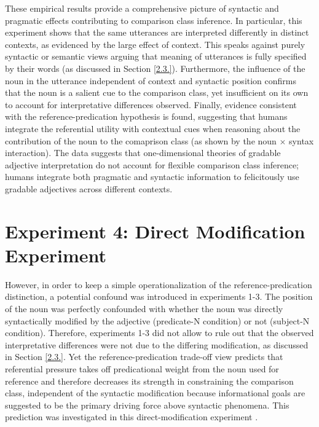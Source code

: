 These empirical results provide a comprehensive picture of syntactic and pragmatic effects contributing to comparison class inference. In particular, this experiment shows that the same utterances are interpreted differently in distinct contexts, as evidenced by the large effect of context. This speaks against purely syntactic or semantic views arguing that meaning of utterances is fully specified by their words (as discussed in Section \ref{2.3.}). Furthermore, the influence of the noun in the utterance independent of context and syntactic position confirms that the noun is a salient cue to the comparison class, yet insufficient on its own to account for interpretative differences observed. Finally, evidence consistent with the reference-predication hypothesis is found, suggesting that humans integrate the referential utility with contextual cues when reasoning about the contribution of the noun to the comaprison class (as shown by the noun $\times$ syntax interaction). The data suggests that one-dimensional theories of gradable adjective interpretation do not account for flexible comparison class inference; humans integrate both pragmatic and syntactic information to felicitously use gradable adjectives across different contexts. 

\section{Experiment 4: Direct Modification Experiment} 
However, in order to keep a simple operationalization of the reference-predication distinction, a potential confound was introduced in experiments 1-3. The position of the noun was perfectly confounded with whether the noun was directly syntactically modified by the adjective (predicate-N condition) or not (subject-N condition). Therefore, experiments 1-3 did not allow to rule out that the observed interpretative differences were not due to the differing modification, as discussed in Section \ref{2.3.}.  Yet the reference-predication trade-off view predicts that referential pressure takes off predicational weight from the noun used for reference and therefore decreases its strength in constraining the comparison class, independent of the syntactic modification because informational goals are suggested to be the primary driving force above syntactic phenomena. This prediction was investigated in this direct-modification experiment \parencite{TesslerEtAl2020AMLaP}.

